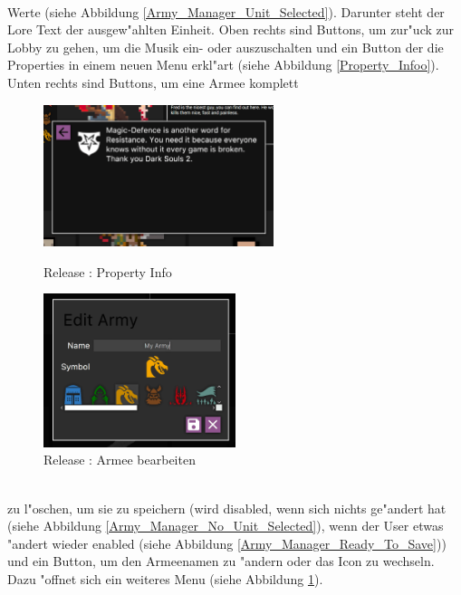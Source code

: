 \documentclass[12pt, titlepage]{scrartcl}
\newcommand{\RN}[1]{%
	\textup{\uppercase\expandafter{\romannumeral#1}}%
}
\begin{document}
			    \ \\ Werte (siehe Abbildung \ref{Army_Manager_Unit_Selected}). Darunter steht der Lore Text der ausgew"ahlten Einheit. Oben rechts sind Buttons, um zur"uck zur Lobby zu gehen, um die Musik ein- oder auszuschalten und ein Button der die Properties in einem neuen Menu erkl"art (siehe Abbildung \ref{Property_Infoo}). Unten rechts sind Buttons, um eine Armee komplett \\
			    \begin{figure}[H]
                    \centering
                    \begin{minipage}{0.6\textwidth}
                        \centering
                        \includegraphics[width=0.6\textwidth]{images/old_state/army_manager/PropertyInfo.png}
                        \caption{Release \RN{2}: Property Info}
                        \label{Property_Infoo}
                    \end{minipage}%
                    \begin{minipage}{0.5\textwidth}
                        \centering
                        \includegraphics[width=0.5\textwidth]{images/old_state/army_manager/EditArmy.png}
                        \caption{Release \RN{2}: Armee bearbeiten}
                        \label{Edit_Army}
                    \end{minipage}
                \end{figure}
                \ \\ zu l"oschen, um sie zu speichern (wird disabled, wenn sich nichts ge"andert hat (siehe Abbildung \ref{Army_Manager_No_Unit_Selected}), wenn der User etwas "andert wieder enabled (siehe Abbildung \ref{Army_Manager_Ready_To_Save})) und ein Button, um den Armeenamen zu "andern oder das Icon zu wechseln. Dazu "offnet sich ein weiteres Menu (siehe Abbildung \ref{Edit_Army}). \\
\end{document}
